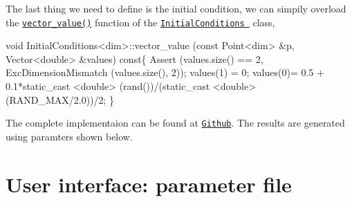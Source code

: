  The last thing we need to define is the initial condition, we can simpily overload the \href{../html/class_initial_conditions.html#aa10cfdd7350c3810a8deab707f397657}{\tt vector\-\_\-value()} function of the \href{../html/class_initial_conditions.html}{\tt Initial\-Conditions } class, 
\begin{DoxyCode}
\textcolor{keywordtype}{void} InitialConditions<dim>::vector_value (\textcolor{keyword}{const} Point<dim>   &p, Vector<double>   &values)\textcolor{keyword}{ const}\{
  Assert (values.size() == 2, ExcDimensionMismatch (values.size(), 2));
  values(1) = 0;    
  values(0)= 0.5 + 0.1*static\_cast <\textcolor{keywordtype}{double}> (rand())/(static\_cast <double>(RAND\_MAX/2.0))/2;
\}
\end{DoxyCode}
 The complete implementaion can be found at \href{https://github.com/mechanoChem/mechanoChemFEM/tree/example/Example1_diffusion_eaction}{\tt Github}. The results are generated using paramters shown below.\hypertarget{growth_file}{}\section{User interface\-: parameter file}\label{growth_file}


